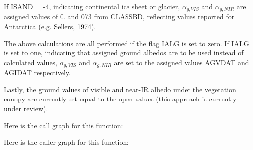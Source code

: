 If I\+S\+A\+N\+D = -\/4, indicating continental ice sheet or glacier, $\alpha_{g,VIS}$ and $\alpha_{g,NIR}$ are assigned values of 0. and 073 from C\+L\+A\+S\+S\+B\+D, reflecting values reported for Antarctica (e.\+g. Sellers, 1974).

The above calculations are all performed if the flag I\+A\+L\+G is set to zero. If I\+A\+L\+G is set to one, indicating that assigned ground albedos are to be used instead of calculated values, $\alpha_{g,VIS}$ and $\alpha_{g,NIR}$ are set to the assigned values A\+G\+V\+D\+A\+T and A\+G\+I\+D\+A\+T respectively.

Lastly, the ground values of visible and near-\/\+I\+R albedo under the vegetation canopy are currently set equal to the open values (this approach is currently under review).

Here is the call graph for this function\+:




Here is the caller graph for this function\+:


